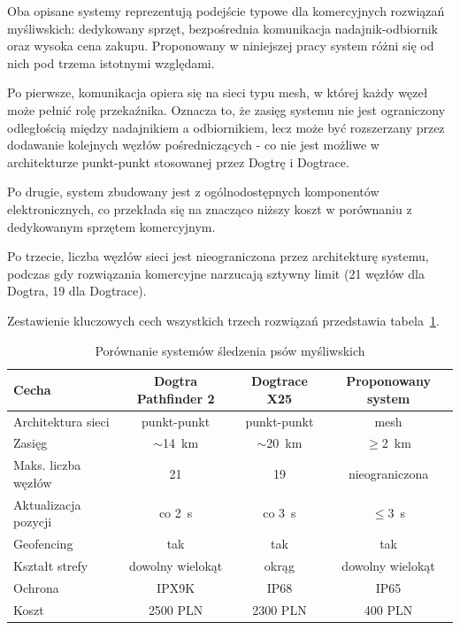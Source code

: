 Oba opisane systemy reprezentują podejście typowe dla komercyjnych rozwiązań myśliwskich:
dedykowany sprzęt, bezpośrednia komunikacja nadajnik-odbiornik oraz wysoka cena zakupu.
Proponowany w niniejszej pracy system różni się od nich pod trzema istotnymi względami.

Po pierwsze, komunikacja opiera się na sieci typu mesh, w której każdy węzeł może pełnić
rolę przekaźnika. Oznacza to, że zasięg systemu nie jest ograniczony odległością między
nadajnikiem a odbiornikiem, lecz może być rozszerzany przez dodawanie kolejnych węzłów
pośredniczących - co nie jest możliwe w architekturze punkt-punkt stosowanej przez Dogtrę
i Dogtrace.

Po drugie, system zbudowany jest z ogólnodostępnych komponentów elektronicznych, co 
przekłada się na znacząco niższy koszt w porównaniu z dedykowanym sprzętem komercyjnym.

Po trzecie, liczba węzłów sieci jest nieograniczona przez architekturę systemu, podczas gdy
rozwiązania komercyjne narzucają sztywny limit (21 węzłów dla Dogtra, 19 dla Dogtrace).

Zestawienie kluczowych cech wszystkich trzech rozwiązań przedstawia tabela~\ref{tab:porownanie}.

\begin{table}[!h]
    \caption{Porównanie systemów śledzenia psów myśliwskich}
    \label{tab:porownanie}
    \centering
    \begin{tabular}{|l|c|c|c|}
        \hline
        \textbf{Cecha} & \textbf{Dogtra Pathfinder 2} & \textbf{Dogtrace X25} & \textbf{Proponowany system} \\
        \hline
        Architektura sieci      & punkt-punkt & punkt-punkt & mesh \\
        Zasięg                  & $\sim$14~km & $\sim$20~km & $\geq$2~km\footnotemark[1] \\
        Maks. liczba węzłów     & 21          & 19          & nieograniczona\footnotemark[2] \\
        Aktualizacja pozycji    & co 2~s      & co 3~s      & $\leq$3~s \\
        Geofencing              & tak         & tak         & tak \\
        Kształt strefy          & dowolny wielokąt & okrąg  & dowolny wielokąt \\
        Ochrona                 & IPX9K       & IP68        & IP65 \\
        Koszt                   & 2500 PLN    & 2300 PLN    & 400 PLN\footnotemark[3] \\
        \hline
    \end{tabular}
\end{table}
